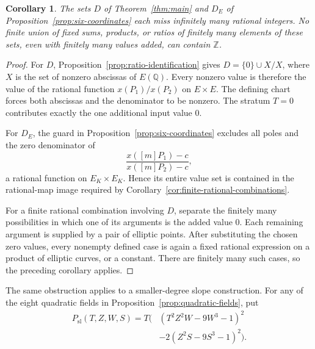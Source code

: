 \documentclass[11pt,a4paper]{article}
\newtheorem{corollary}[theorem]{Corollary}
\theoremstyle{definition}
\newcommand{\Q}{\mathbb Q}\newcommand{\Z}{\mathbb Z}
\begin{document}
\begin{corollary}\label{cor:ratios-miss-integers}
The sets $D$ of Theorem~\ref{thm:main} and $D_E$ of
Proposition~\ref{prop:six-coordinates} each miss infinitely many
rational integers. No finite union of fixed sums, products, or
ratios of finitely many elements of these sets, even with finitely
many values added, can contain $\Z$.
\end{corollary}
\begin{proof}
For $D$, Proposition~\ref{prop:ratio-identification} gives
$D=\{0\}\cup X/X$, where $X$ is the set of nonzero abscissas of
$E(\Q)$. Every nonzero value is therefore the value of the rational
function $x(P_1)/x(P_2)$ on $E\times E$. The defining chart forces
both abscissas and the denominator to be nonzero. The stratum $T=0$
contributes exactly the one additional input value $0$.

For $D_E$, the guard in Proposition~\ref{prop:six-coordinates}
excludes all poles and the zero denominator of
\[
           \frac{x([m]P_1)-c}{x([m]P_2)-c},
\]
a rational function on $E_K\times E_K$. Hence its entire value
set is contained in the rational-map image required by
Corollary~\ref{cor:finite-rational-combinations}.

For a finite rational combination involving $D$, separate the
finitely many possibilities in which one of its arguments is the
added value $0$. Each remaining argument is supplied by a pair of
elliptic points. After substituting the chosen zero values, every
nonempty defined case is again a fixed rational expression on a
product of elliptic curves, or a constant. There are finitely many
such cases, so the preceding corollary applies.
\end{proof}

The same obstruction applies to a smaller-degree slope construction.
For any of the eight quadratic fields in
Proposition~\ref{prop:quadratic-fields}, put
\[
\begin{split}
 P_{\mathrm{sl}}(T,Z,W,S)=T\bigl(&
 (T^2Z^2W-9W^3-1)^2\\
 &-2(Z^2S-9S^3-1)^2\bigr).
\end{split}
\]
\end{document}
